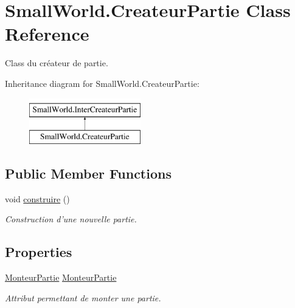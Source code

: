 \hypertarget{class_small_world_1_1_createur_partie}{\section{Small\-World.\-Createur\-Partie Class Reference}
\label{class_small_world_1_1_createur_partie}
}


Class du créateur de partie.  


Inheritance diagram for Small\-World.\-Createur\-Partie\-:\begin{figure}[H]
\begin{center}
\leavevmode
\includegraphics[height=2.000000cm]{class_small_world_1_1_createur_partie}
\end{center}
\end{figure}
\subsection*{Public Member Functions}
\begin{DoxyCompactItemize}
\item 
\hypertarget{class_small_world_1_1_createur_partie_a6c808936d929f91fa222ec40dde0105a}{void \hyperlink{class_small_world_1_1_createur_partie_a6c808936d929f91fa222ec40dde0105a}{construire} ()}\label{class_small_world_1_1_createur_partie_a6c808936d929f91fa222ec40dde0105a}

\begin{DoxyCompactList}\small\item\em Construction d'une nouvelle partie. \end{DoxyCompactList}\end{DoxyCompactItemize}
\subsection*{Properties}
\begin{DoxyCompactItemize}
\item 
\hypertarget{class_small_world_1_1_createur_partie_a9e93618a0b35e91b328df64ba8816164}{\hyperlink{class_small_world_1_1_monteur_partie}{Monteur\-Partie} \hyperlink{class_small_world_1_1_createur_partie_a9e93618a0b35e91b328df64ba8816164}{Monteur\-Partie}}\label{class_small_world_1_1_createur_partie_a9e93618a0b35e91b328df64ba8816164}

\begin{DoxyCompactList}\small\item\em Attribut permettant de monter une partie. \end{DoxyCompactList}\end{DoxyCompactItemize}


